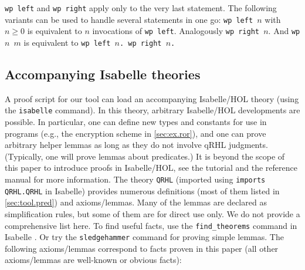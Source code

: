 \documentclass{article}
\begin{document}
\medskip

\texttt{wp left} and \texttt{wp right} apply only to the very last statement.
The following variants can be used to handle several statements in one go:
\texttt{wp left $n$} with $n\geq0$ is equivalent to $n$
invocations of \texttt{wp left}.
Analogously \texttt{wp right $n$}.
And \texttt{wp $n$ $m$} is equivalent to \texttt{wp left $n$. wp right $n$.}

\subsection{Accompanying Isabelle theories}
\label{sec:isabelle}

A proof script for our tool can load an accompanying Isabelle/HOL
theory (using the \texttt{isabelle} command). In this theory,
arbitrary Isabelle/HOL developments are possible.  In particular, one
can define new types and constants for use in programs (e.g., the
encryption scheme in \autoref{sec:ex.ror}), and one can prove
arbitrary helper lemmas as long as they do not involve qRHL
judgments. (Typically, one will prove lemmas about predicates.)  It is
beyond the scope of this paper to introduce proofs in Isabelle/HOL,
see the tutorial \cite{isabelle-tutorial} and the
reference manual \cite{isar-ref} for more information. The theory
\texttt{QRHL} (imported using \texttt{imports QRHL.QRHL} in Isabelle) provides numerous definitions (most of them listed in
\autoref{sec:tool.pred}) and axioms/lemmas. Many of the lemmas are
declared as simplification rules, but some of them are for direct use
only. We do not provide a comprehensive list here. To find useful
facts, use the \texttt{find\_theorems} command in Isabelle
\cite{isar-ref}. Or try the \texttt{sledgehammer} command
\cite{isar-ref} for proving simple lemmas.  The following
axioms/lemmas correspond to facts proven in this paper (all other axioms/lemmas are
well-known or obvious facts):
\end{document}
